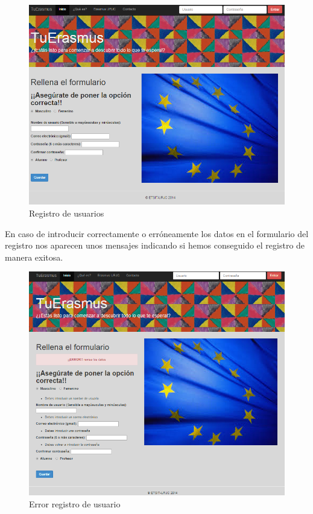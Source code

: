 \begin{figure}[htbp]
	
	\centering
	\includegraphics[scale=0.5]{./Figuras/tuerasmusPages/publicPages/register.png}
	\caption{Registro de usuarios}
	\label{fig:regUsu}
	
\end{figure}

En caso de introducir correctamente o err\'oneamente los datos en el formulario del registro nos aparecen unos mensajes indicando si hemos conseguido el registro de manera exitosa.\\

\begin{figure}[htbp]
	
	\centering
	\includegraphics[scale=0.5]{./Figuras/tuerasmusPages/publicPages/errorRegister.png}
	\caption{Error registro de usuario}
	\label{fig:errRegUsu}
	
\end{figure}

